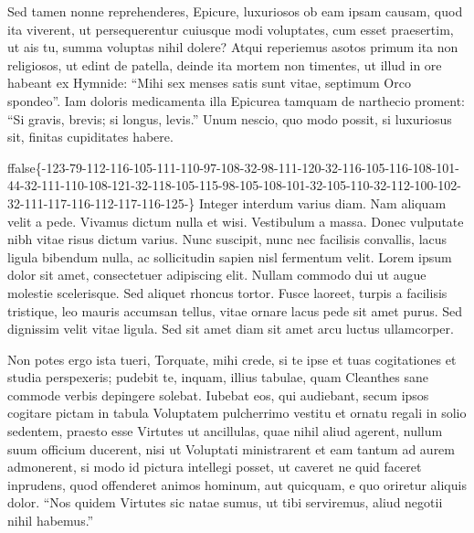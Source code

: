 \documentclass[twoside]{extreport}
\begin{document}
Sed tamen nonne reprehenderes, Epicure, luxuriosos ob eam ipsam causam,
quod ita viverent, ut persequerentur cuiusque modi voluptates, cum esset
praesertim, ut ais tu, summa voluptas nihil dolere? Atqui reperiemus
asotos primum ita non religiosos, ut edint de patella, deinde ita mortem
non timentes, ut illud in ore habeant ex Hymnide: ``Mihi sex menses
satis sunt vitae, septimum Orco spondeo''. Iam doloris medicamenta illa
Epicurea tamquam de narthecio proment: ``Si gravis, brevis; si longus,
levis.'' Unum nescio, quo modo possit, si luxuriosus sit, finitas
cupiditates habere.























\begin{block}{}
ffalse\{-123-79-112-116-105-111-110-97-108-32-98-111-120-32-116-105-116-108-101-44-32-111-110-108-121-32-118-105-115-98-105-108-101-32-105-110-32-112-100-102-32-111-117-116-112-117-116-125-\}\fi{}
Integer interdum varius diam. Nam aliquam velit a pede.
Vivamus dictum nulla et wisi. Vestibulum a massa. Donec vulputate nibh
vitae risus dictum varius. Nunc suscipit, nunc nec facilisis convallis,
lacus ligula bibendum nulla, ac sollicitudin sapien nisl fermentum
velit. Lorem ipsum dolor sit amet, consectetuer adipiscing elit. Nullam
commodo dui ut augue molestie scelerisque. Sed aliquet rhoncus tortor.
Fusce laoreet, turpis a facilisis tristique, leo mauris accumsan tellus,
vitae ornare lacus pede sit amet purus. Sed dignissim velit vitae
ligula. Sed sit amet diam sit amet arcu luctus ullamcorper.

Non potes ergo ista tueri, Torquate, mihi crede, si te
ipse et tuas cogitationes et studia perspexeris; pudebit te, inquam,
illius tabulae, quam Cleanthes sane commode verbis depingere solebat.
Iubebat eos, qui audiebant, secum ipsos cogitare pictam in tabula
Voluptatem pulcherrimo vestitu et ornatu regali in solio sedentem,
praesto esse Virtutes ut ancillulas, quae nihil aliud agerent, nullum
suum officium ducerent, nisi ut Voluptati ministrarent et eam tantum ad
aurem admonerent, si modo id pictura intellegi posset, ut caveret ne
quid faceret inprudens, quod offenderet animos hominum, aut quicquam, e
quo oriretur aliquis dolor. ``Nos quidem Virtutes sic natae sumus, ut
tibi serviremus, aliud negotii nihil habemus.''
\end{block}
\end{document}
